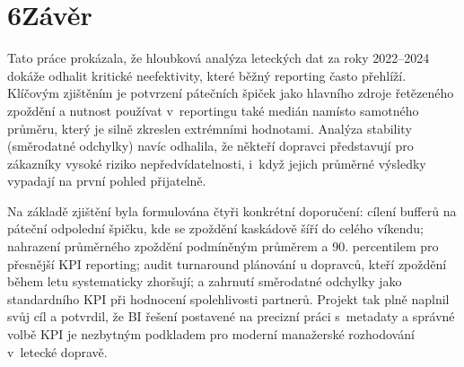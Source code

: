 \documentclass{protokol}
\begin{document}
\section{6\quad Závěr}

Tato práce prokázala, že hloubková analýza leteckých dat za roky 2022--2024 dokáže odhalit kritické neefektivity, které běžný reporting často přehlíží. Klíčovým zjištěním je potvrzení pátečních špiček jako hlavního zdroje řetězeného zpoždění a nutnost používat v~reportingu také medián namísto samotného průměru, který je silně zkreslen extrémními hodnotami. Analýza stability (směrodatné odchylky) navíc odhalila, že někteří dopravci představují pro zákazníky vysoké riziko nepředvídatelnosti, i~když jejich průměrné výsledky vypadají na první pohled přijatelně.

Na základě zjištění byla formulována čtyři konkrétní doporučení: cílení bufferů na páteční odpolední špičku, kde se zpoždění kaskádově šíří do celého víkendu; nahrazení průměrného zpoždění podmíněným průměrem a 90. percentilem pro přesnější KPI reporting; audit turnaround plánování u dopravců, kteří zpoždění během letu systematicky zhoršují; a zahrnutí směrodatné odchylky jako standardního KPI při hodnocení spolehlivosti partnerů. Projekt tak plně naplnil svůj cíl a potvrdil, že BI řešení postavené na precizní práci s~metadaty a správné volbě KPI je nezbytným podkladem pro moderní manažerské rozhodování v~letecké dopravě.
\end{document}
